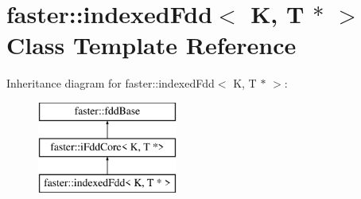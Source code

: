 \hypertarget{classfaster_1_1indexedFdd_3_01K_00_01T_01_5_01_4}{}\section{faster\+:\+:indexed\+Fdd$<$ K, T $\ast$ $>$ Class Template Reference}
\label{classfaster_1_1indexedFdd_3_01K_00_01T_01_5_01_4}
Inheritance diagram for faster\+:\+:indexed\+Fdd$<$ K, T $\ast$ $>$\+:\begin{figure}[H]
\begin{center}
\leavevmode
\includegraphics[height=3.000000cm]{classfaster_1_1indexedFdd_3_01K_00_01T_01_5_01_4}
\end{center}
\end{figure}
